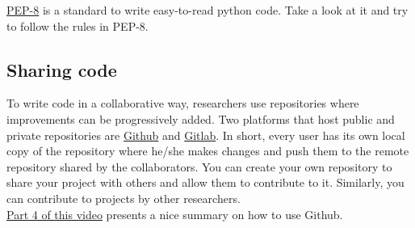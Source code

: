 \documentclass[3p]{elsarticle} %
\begin{document}
\href{https://www.python.org/dev/peps/pep-0008/}{PEP-8} is a standard to write easy-to-read python code. Take a look at it and try to follow the rules in PEP-8.

\subsection{Sharing code}

To write code in a collaborative way, researchers use repositories where improvements can be progressively added. Two platforms that host public and private repositories are \href{https:\\github.com}{Github} and \href{https:\\gitlab.com}{Gitlab}. In short, every user has its own local copy of the repository where he/she makes changes and push them to the remote repository shared by the collaborators. You can create your own repository to share your project with others and allow them to contribute to it. Similarly, you can contribute to projects by other researchers.\\
\href{https://data.ene.iiasa.ac.at/teaching/osesm_2020_lecture_1_recording.html}{Part 4 of this video} presents a nice summary on how to use Github. 


\end{document}
